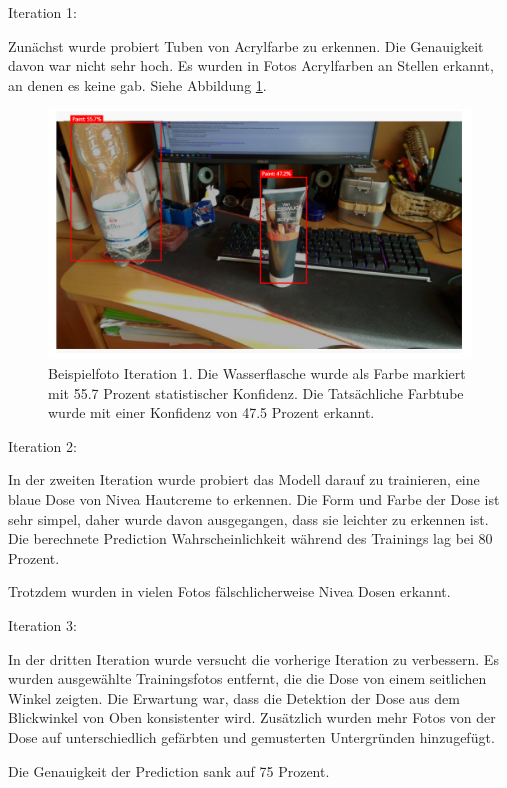 \documentclass[german,a4paper, 12pt]{llncs}
\begin{document}
Iteration 1:

Zunächst wurde probiert Tuben von Acrylfarbe zu erkennen. Die Genauigkeit davon war nicht sehr hoch. Es wurden in Fotos Acrylfarben an Stellen erkannt, an denen es keine gab. Siehe Abbildung \ref{image:customVisionPaint}. 

\begin{figure}[H]
	\centering
	\includegraphics[width=1.0\textwidth]{images/customVisionPaint.PNG}
	\caption[]{Beispielfoto Iteration 1. Die Wasserflasche wurde als Farbe markiert mit 55.7 Prozent statistischer Konfidenz. Die Tatsächliche Farbtube wurde mit einer Konfidenz von 47.5 Prozent erkannt.}
	\label{image:customVisionPaint}
\end{figure}

Iteration 2:

In der zweiten Iteration wurde probiert das Modell darauf zu trainieren, eine blaue Dose von Nivea Hautcreme to erkennen. Die Form und Farbe der Dose ist sehr simpel, daher wurde davon ausgegangen, dass sie leichter zu erkennen ist. Die berechnete Prediction Wahrscheinlichkeit während des Trainings lag bei 80 Prozent.

Trotzdem wurden in vielen Fotos fälschlicherweise Nivea Dosen erkannt. 



Iteration 3:

In der dritten Iteration wurde versucht die vorherige Iteration zu verbessern. Es wurden ausgewählte Trainingsfotos entfernt, die die Dose von einem seitlichen Winkel zeigten. Die Erwartung war, dass die Detektion der Dose aus dem Blickwinkel von Oben konsistenter wird. Zusätzlich wurden mehr Fotos von der Dose auf unterschiedlich gefärbten und gemusterten Untergründen hinzugefügt. 

Die Genauigkeit der Prediction sank auf 75 Prozent.
\end{document}
